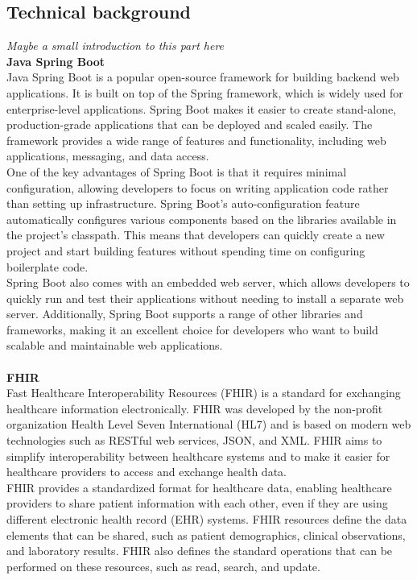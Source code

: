 \documentclass[]{report}
\begin{document}
\subsection{Technical background}
\textit{Maybe a small introduction to this part here}\\
\textbf{Java Spring Boot}\\
Java Spring Boot is a popular open-source framework for building backend web applications. It is built on top of the Spring framework, which is widely used for enterprise-level applications. Spring Boot makes it easier to create stand-alone, production-grade applications that can be deployed and scaled easily. The framework provides a wide range of features and functionality, including web applications, messaging, and data access.\\
One of the key advantages of Spring Boot is that it requires minimal configuration, allowing developers to focus on writing application code rather than setting up infrastructure. Spring Boot's auto-configuration feature automatically configures various components based on the libraries available in the project's classpath. This means that developers can quickly create a new project and start building features without spending time on configuring boilerplate code.\\
Spring Boot also comes with an embedded web server, which allows developers to quickly run and test their applications without needing to install a separate web server. Additionally, Spring Boot supports a range of other libraries and frameworks, making it an excellent choice for developers who want to build scalable and maintainable web applications.\\\\
\textbf{FHIR}\\
Fast Healthcare Interoperability Resources (FHIR) is a standard for exchanging healthcare information electronically. FHIR was developed by the non-profit organization Health Level Seven International (HL7) and is based on modern web technologies such as RESTful web services, JSON, and XML. FHIR aims to simplify interoperability between healthcare systems and to make it easier for healthcare providers to access and exchange health data.\\
FHIR provides a standardized format for healthcare data, enabling healthcare providers to share patient information with each other, even if they are using different electronic health record (EHR) systems. FHIR resources define the data elements that can be shared, such as patient demographics, clinical observations, and laboratory results. FHIR also defines the standard operations that can be performed on these resources, such as read, search, and update.\\
\end{document}

